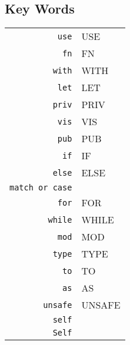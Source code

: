 \documentclass{article}
\begin{document}
		\subsection{Key Words}
			\begin{tabular}{rl}
				\texttt{use} & USE\\
				\texttt{fn} & FN\\
				\texttt{with} & WITH\\
				\texttt{let} & LET\\
				\texttt{priv} & PRIV\\
				\texttt{vis} & VIS\\
				\texttt{pub} & PUB\\
				\texttt{if} & IF\\
				\texttt{else} & ELSE\\ 
				\texttt{match or case} & \\
				\texttt{for} & FOR\\
				\texttt{while} & WHILE\\
				\texttt{mod} & MOD\\
				\texttt{type} & TYPE \\
				\texttt{to} & TO\\
				\texttt{as} & AS\\
				\texttt{unsafe} & UNSAFE\\
				\texttt{self} & \\
				\texttt{Self} & \\
			\end{tabular}
\end{document}
